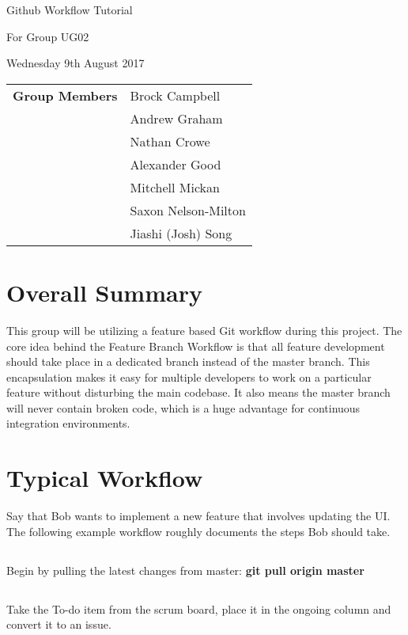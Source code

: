 \documentclass{article}
\begin{document}
\begin{center}    
{\huge Github Workflow Tutorial \par}
\vspace{0.5cm}
{\large For Group UG02 \par}
\vspace{0.5cm}
{\large Wednesday 9th August 2017 \par}
\vspace{0.5cm}
\end{center}

\begin{flushleft}
\begin{tabular}{ll}
{\bfseries Group Members} & Brock Campbell \\
 & Andrew Graham \\
 & Nathan Crowe \\
 & Alexander Good \\
 & Mitchell Mickan \\
 & Saxon Nelson-Milton \\
 & Jiashi (Josh) Song \\
\end{tabular}
\end{flushleft}

\section{Overall Summary}
This group will be utilizing a feature based Git workflow during this project. The core idea behind the Feature Branch Workflow is that all feature development should take place in a dedicated branch instead of the master branch. This encapsulation makes it easy for multiple developers to work on a particular feature without disturbing the main codebase. It also means the master branch will never contain broken code, which is a huge advantage for continuous integration environments.

\section{Typical Workflow}
Say that Bob wants to implement a new feature that involves updating the UI. The following example workflow roughly documents the steps Bob should take.
	\subsection{} Begin by pulling the latest changes from master: \textbf{git pull origin master}
    \subsection{} Take the To-do item from the scrum board, place it in the ongoing column and convert it to an issue.
\end{document}
